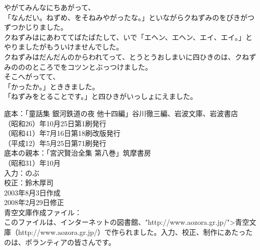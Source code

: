 \documentclass[
    a4paper,
    10pt,
    book]
    {tarticle}
\begin{document}
やがてみんなにちあがって、\\
「なんだい。ねずめ、をそねみやがったな。」といながらクねずみのをぴきがつずつかじりました。\\
\indent クねずみはにあわててばたばたして、いで「エヘン、エヘン、エイ、エイ。」とやりましたがもういけませんでした。\\
\indent クねずみはだんだんのからわれてって、とうとうおしまいに四ひきのは、クねずみのののところでをコツンとぶっつけました。\\
\indent そこへがってて、\\
「かったか。」とききました。\\
「ねずみをとることです。」と四ひきがいっしょにえました。

\newpage
\nolinenumbers
底本：「童話集 銀河鉄道の夜 他十四編」谷川徹三編、岩波文庫、岩波書店
\\
（昭和26）年10月25日第1刷発行\\
（昭和41）年7月16日第18刷改版発行\\
（平成12）年5月25日第71刷発行\\
底本の親本：「宮沢賢治全集 第八巻」筑摩書房\\
（昭和31）年10月\\
入力：のぶ\\
校正：鈴木厚司\\
2003年8月3日作成\\
2008年2月29日修正\\
青空文庫作成ファイル：\\
このファイルは、インターネットの図書館、"http://www.aozora.gr.jp/">青空文庫（http://www.aozora.gr.jp/）で作られました。入力、校正、制作にあたったのは、ボランティアの皆さんです。\\
\\
\end{document}
